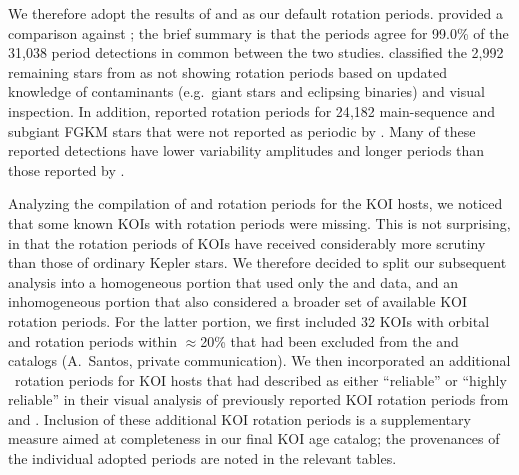 \documentclass[11pt,twocolumn,tighten]{aastex63}
\begin{document}
We therefore adopt the results of  and
 as our default rotation periods.
 provided a comparison against
; the brief summary is that the periods
agree for 99.0\% of the 31{,}038 period detections in common between
the two studies.   classified the 2{,}992
remaining stars from  as not showing
rotation periods based on updated knowledge of contaminants
(e.g.~giant stars and eclipsing binaries) and visual inspection.  In
addition,  reported rotation periods for
24{,}182 main-sequence and subgiant FGKM stars that were not reported
as periodic by .  Many of these reported
detections have lower variability amplitudes and longer periods than
those reported by . 

Analyzing the compilation of  and
 rotation periods for the KOI hosts, we
noticed that some known KOIs with rotation periods were missing.  This
is not surprising, in that the rotation periods of KOIs have received
considerably more scrutiny than those of ordinary Kepler stars.  We
therefore decided to split our subsequent analysis into a homogeneous
portion that used only the  and
 data, and an inhomogeneous portion that also
considered a broader set of available KOI rotation periods.  For the
latter portion, we first included 32 KOIs with orbital and rotation
periods within $\approx$20\% that had been
excluded %
from the  and 
catalogs (A.~Santos, private communication).  We then incorporated an
additional \nnewdavidtwentyone\ rotation periods for KOI hosts that
\citet{David_2021} had described as either ``reliable'' or ``highly
reliable'' in their visual analysis of previously reported KOI
rotation periods from \citet{McQuillan_2013,Walkowicz_2013,Mazeh_2015}
and \citet{Angus_2018}.  Inclusion of these additional KOI rotation
periods is a supplementary measure aimed at completeness in our final
KOI age catalog; the provenances of the individual adopted periods are
noted in the relevant tables.
\end{document}
